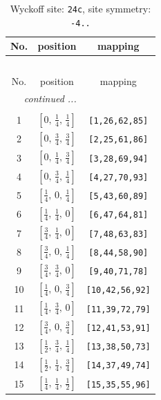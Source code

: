 \documentclass[fleqn,8pt]{jsarticle}
\begin{document}
\begin{longtable}{ccc}
\caption{Wyckoff site: {\tt 24c}, site symmetry: {\tt -4..}}
 \\
 \hline \hline
No. & position & mapping \\ \hline \endfirsthead

\multicolumn{2}{l}{\tablename\ \thetable{}} \\
 \hline \hline
No. & position & mapping \\ \hline \endhead

 \hline \hline
\multicolumn{2}{r}{\footnotesize\it continued ...} \\ \endfoot

 \hline \hline
\multicolumn{2}{r}{} \\ \endlastfoot

1 & $\left[ 0,\, \frac{1}{4},\, \frac{1}{4} \right]$ & {\tt [1,26,62,85]} \\ \hline
2 & $\left[ 0,\, \frac{3}{4},\, \frac{3}{4} \right]$ & {\tt [2,25,61,86]} \\ \hline
3 & $\left[ 0,\, \frac{1}{4},\, \frac{3}{4} \right]$ & {\tt [3,28,69,94]} \\ \hline
4 & $\left[ 0,\, \frac{3}{4},\, \frac{1}{4} \right]$ & {\tt [4,27,70,93]} \\ \hline
5 & $\left[ \frac{1}{4},\, 0,\, \frac{1}{4} \right]$ & {\tt [5,43,60,89]} \\ \hline
6 & $\left[ \frac{1}{4},\, \frac{1}{4},\, 0 \right]$ & {\tt [6,47,64,81]} \\ \hline
7 & $\left[ \frac{3}{4},\, \frac{1}{4},\, 0 \right]$ & {\tt [7,48,63,83]} \\ \hline
8 & $\left[ \frac{3}{4},\, 0,\, \frac{1}{4} \right]$ & {\tt [8,44,58,90]} \\ \hline
9 & $\left[ \frac{3}{4},\, \frac{3}{4},\, 0 \right]$ & {\tt [9,40,71,78]} \\ \hline
10 & $\left[ \frac{1}{4},\, 0,\, \frac{3}{4} \right]$ & {\tt [10,42,56,92]} \\ \hline
11 & $\left[ \frac{1}{4},\, \frac{3}{4},\, 0 \right]$ & {\tt [11,39,72,79]} \\ \hline
12 & $\left[ \frac{3}{4},\, 0,\, \frac{3}{4} \right]$ & {\tt [12,41,53,91]} \\ \hline
13 & $\left[ \frac{1}{2},\, \frac{3}{4},\, \frac{1}{4} \right]$ & {\tt [13,38,50,73]} \\ \hline
14 & $\left[ \frac{1}{2},\, \frac{1}{4},\, \frac{3}{4} \right]$ & {\tt [14,37,49,74]} \\ \hline
15 & $\left[ \frac{1}{4},\, \frac{1}{4},\, \frac{1}{2} \right]$ & {\tt [15,35,55,96]} \\ \hline

\end{longtable}
\end{document}

